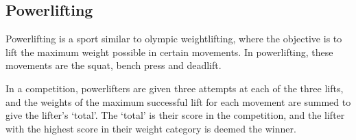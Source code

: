 \subsection{Powerlifting}

Powerlifting is a sport similar to olympic weightlifting, where the objective is to lift the maximum weight possible in certain movements. In powerlifting, these movements are the squat, bench press and deadlift.





In a competition, powerlifters are given three attempts at each of the three lifts, and the weights of the maximum successful lift for each movement are summed to give the lifter’s ‘total’. The ‘total’ is their score in the competition, and the lifter with the highest score in their weight category is deemed the winner.